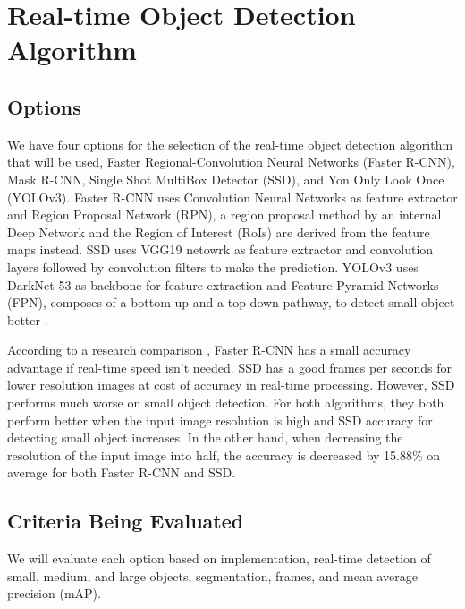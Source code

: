 \documentclass[onecolumn, draftclsnofoot,10pt, compsoc]{IEEEtran}
\begin{document}
\section{Real-time Object Detection Algorithm}

\subsection{Options}
We have four options for the selection of the real-time object detection algorithm that will be used, Faster Regional-Convolution Neural Networks (Faster R-CNN)\cite{fasterrcnn}, Mask R-CNN\cite{maskrcnn}, Single Shot MultiBox Detector (SSD)\cite{SSD}, and Yon Only Look Once (YOLOv3)\cite{YOLOv3}. Faster R-CNN uses Convolution Neural Networks as feature extractor and Region Proposal Network (RPN), a region proposal method by an internal Deep Network and the Region of Interest (RoIs) are derived from the feature maps instead. SSD uses VGG19 netowrk as feature extractor and convolution layers followed by convolution filters to make the prediction. YOLOv3 uses DarkNet 53 as backbone for feature extraction and Feature Pyramid Networks (FPN), composes of a bottom-up and a top-down pathway, to detect small object better \cite{pda3}.

According to a research comparison \cite{pda1}, Faster R-CNN has a small accuracy advantage if real-time speed isn't needed. SSD has a good frames per seconds for lower resolution images at cost of accuracy in real-time processing. However, SSD performs much worse on small object detection. For both algorithms, they both perform better when the input image resolution is high and SSD accuracy for detecting small object increases. In the other hand, when decreasing the resolution of the input image into half, the accuracy is decreased by 15.88\% on average for both Faster R-CNN and SSD.

\subsection{Criteria Being Evaluated}
We will evaluate each option based on implementation, real-time detection of small, medium, and large objects, segmentation, frames, and mean average precision (mAP).
\end{document}
